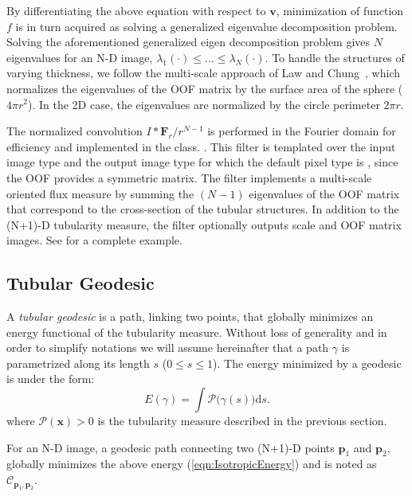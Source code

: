 \documentclass{InsightArticle}
\begin{document}
By differentiating the above equation with respect to $\mathbf{v}$, minimization of function $f$ is in turn acquired as solving a generalized eigenvalue decomposition problem. Solving the aforementioned generalized eigen decomposition problem gives $N$ eigenvalues for an N-D image, $\lambda_1(\cdot)\leq \dots\leq \lambda_{N}(\cdot)$. To handle the structures of varying thickness, we follow the multi-scale approach of Law and Chung~\cite{Law08}, which normalizes the  eigenvalues of the OOF matrix by the surface area of the sphere ($4\pi r^2$). In the 2D case, the eigenvalues are normalized by the circle perimeter $2\pi r$.

The normalized convolution $I*\mathbf{F}_r/r^{N-1}$ is performed in the Fourier domain 
for efficiency and implemented in  the  class.  .
This filter is templated over the input image type and the output image type for which the default pixel type is , since the OOF provides a symmetric matrix. The filter  implements a multi-scale oriented flux measure by summing the $(N-1)$ eigenvalues of the OOF matrix that correspond to the cross-section of the tubular structures. In addition to the  (N+1)-D tubularity measure, the filter optionally outputs scale and OOF matrix images. See  for a complete example.

\subsection{Tubular Geodesic}
A \textit{tubular geodesic} is a path, linking two points, that globally minimizes an energy functional of the tubularity measure. Without loss of generality and in order to simplify notations we will assume hereinafter that a path $\gamma$ is parametrized along its length $s$ ($0 \leq s \leq 1$). The energy minimized by a geodesic is under the form:
\begin{equation}\label{eqn:IsotropicEnergy}
E(\gamma)=\int \mathcal{P}\big( \gamma(s) \big)\mathrm{d}s.
\end{equation}
where $\mathcal{P(\mathbf{x})} > 0$ is the tubularity measure described in the previous section.

For an N-D image, a geodesic path connecting two (N+1)-D points $\mathbf{p}_{1}$ and $\mathbf{p}_{2}$, globally 
minimizes the above energy (\ref{eqn:IsotropicEnergy}) and is noted as $\mathcal{C}_{\mathbf{p}_{1},\mathbf{p}_{2}}$.
\end{document}
